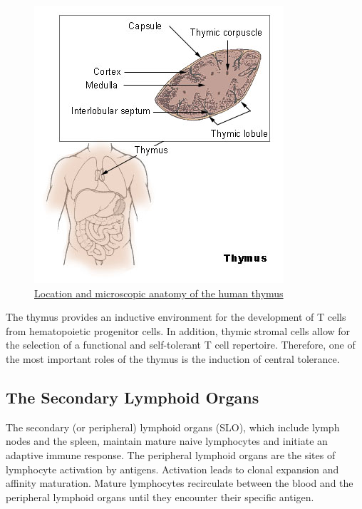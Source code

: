 \begin{figure}

{\centering \includegraphics[width=0.7\linewidth]{./figures/immune/Illu_thymus} 

}

\caption{\href{https://upload.wikimedia.org/wikipedia/commons/c/cf/Illu_thymus.jpg}{Location and microscopic anatomy of the human thymus}}\label{fig:humanthymus}
\end{figure}

The thymus provides an inductive environment for the development of T cells from hematopoietic progenitor cells. In addition, thymic stromal cells allow for the selection of a functional and self-tolerant T cell repertoire. Therefore, one of the most important roles of the thymus is the induction of central tolerance.

\hypertarget{the-secondary-lymphoid-organs}{%
\subsection{The Secondary Lymphoid Organs}\label{the-secondary-lymphoid-organs}}

The secondary (or peripheral) lymphoid organs (SLO), which include lymph nodes and the spleen, maintain mature naive lymphocytes and initiate an adaptive immune response. The peripheral lymphoid organs are the sites of lymphocyte activation by antigens. Activation leads to clonal expansion and affinity maturation. Mature lymphocytes recirculate between the blood and the peripheral lymphoid organs until they encounter their specific antigen.


